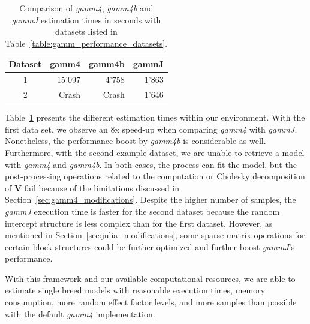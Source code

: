 \begin{table}[H]
\centering
\begin{tabular}{ c r r r }

Dataset & gamm4 & gamm4b & gammJ \\
\hline
\hline
1 & 15'097 & 4'758 & 1'863\\
2 & Crash & Crash & 1'646\\
\end{tabular}
\captionsetup{width=0.4\linewidth}
\caption{Comparison of \textit{gamm4}, \textit{gamm4b} and \textit{gammJ} estimation times in seconds with datasets listed in Table~\ref{table:gamm_performance_datasets}.}
\label{table:gamm_performance_comparison}
\end{table}

Table~\ref{table:gamm_performance_comparison} presents the different estimation times within our environment. With the first data set, we observe an 8x speed-up when comparing \textit{gamm4} with \textit{gammJ}. Nonetheless, the performance boost by \textit{gamm4b} is considerable as well. Furthermore, with the second example dataset, we are unable to retrieve a model with \textit{gamm4} and \textit{gamm4b}. In both cases, the process can fit the model, but the post-processing operations related to the computation or Cholesky decomposition of $\textbf{V}$ fail because of the limitations discussed in Section~\ref{sec:gamm4_modifications}. Despite the higher number of samples, the \textit{gammJ} execution time is faster for the second dataset because the random intercept structure is less complex than for the first dataset. However, as mentioned in Section~\ref{sec:julia_modifications}, some sparse matrix operations for certain block structures could be further optimized and further boost \textit{gammJ}'s performance.


With this framework and our available computational resources, we are able to estimate single breed models with reasonable execution times, memory consumption, more random effect factor levels, and more samples than possible with the default \textit{gamm4} implementation.